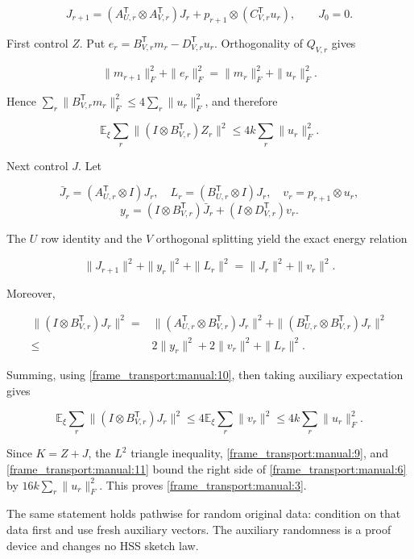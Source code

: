 \documentclass[11pt,oneside,openany,a4paper]{book}
\numberwithin{equation}{chapter}
\theoremstyle{definition}
\theoremstyle{remark}
\begin{document}
\[
J_{r+1}=(A_{U,r}^{\mathsf T}\otimes A_{V,r}^{\mathsf T})J_r
+p_{r+1}\otimes(C_{V,r}^{\mathsf T}u_r),\qquad J_0=0.
\tag{\thechapter.8}\label{frame_transport:manual:8}
\]

First control \(Z\). Put \(e_r=B_{V,r}^{\mathsf T}m_r-D_{V,r}^{\mathsf T}u_r\). Orthogonality of \(Q_{V,r}\) gives

\[
\|m_{r+1}\|_F^2+\|e_r\|_F^2
=\|m_r\|_F^2+\|u_r\|_F^2.
\]

Hence \(\sum_r\|B_{V,r}^{\mathsf T}m_r\|_F^2\le4\sum_r\|u_r\|_F^2\), and therefore

\[
\mathbb E_\xi\sum_r\|(I\otimes B_{V,r}^{\mathsf T})Z_r\|^2
\le4k\sum_r\|u_r\|_F^2.
\tag{\thechapter.9}\label{frame_transport:manual:9}
\]

Next control \(J\). Let

\[
\bar J_r=(A_{U,r}^{\mathsf T}\otimes I)J_r,\quad
L_r=(B_{U,r}^{\mathsf T}\otimes I)J_r,\quad
v_r=p_{r+1}\otimes u_r,
\] \[
y_r=(I\otimes B_{V,r}^{\mathsf T})\bar J_r
+(I\otimes D_{V,r}^{\mathsf T})v_r.
\]

The \(U\) row identity and the \(V\) orthogonal splitting yield the exact energy relation

\[
\|J_{r+1}\|^2+\|y_r\|^2+\|L_r\|^2
=\|J_r\|^2+\|v_r\|^2.
\tag{\thechapter.10}\label{frame_transport:manual:10}
\]

Moreover,

\[
\begin{split}
\|(I\otimes B_{V,r}^{\mathsf T})J_r\|^2
={}&\|(A_{U,r}^{\mathsf T}\otimes B_{V,r}^{\mathsf T})J_r\|^2
+\|(B_{U,r}^{\mathsf T}\otimes B_{V,r}^{\mathsf T})J_r\|^2\\
\le{}&2\|y_r\|^2+2\|v_r\|^2+\|L_r\|^2.
\end{split}
\]

Summing, using \eqref{frame_transport:manual:10}, then taking auxiliary expectation gives

\[
\mathbb E_\xi\sum_r\|(I\otimes B_{V,r}^{\mathsf T})J_r\|^2
\le4\mathbb E_\xi\sum_r\|v_r\|^2
\le4k\sum_r\|u_r\|_F^2.
\tag{\thechapter.11}\label{frame_transport:manual:11}
\]

Since \(K=Z+J\), the \(L^2\) triangle inequality, \eqref{frame_transport:manual:9}, and \eqref{frame_transport:manual:11} bound the right side of \eqref{frame_transport:manual:6} by \(16k\sum_r\|u_r\|_F^2\). This proves \eqref{frame_transport:manual:3}.

The same statement holds pathwise for random original data: condition on that data first and use fresh auxiliary vectors. The auxiliary randomness is a proof device and changes no HSS sketch law.
\end{document}
